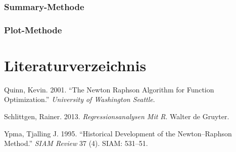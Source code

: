 \documentclass[12pt,]{article}
\begin{document}
\subsubsection{Summary-Methode}\label{summary-methode}

\subsubsection{Plot-Methode}\label{plot-methode}

\section*{Literaturverzeichnis}\label{literaturverzeichnis}

\hypertarget{refs}{}
\hypertarget{ref-quinn2001newton}{}
Quinn, Kevin. 2001. ``The Newton Raphson Algorithm for Function
Optimization.'' \emph{University of Washington Seattle}.

\hypertarget{ref-schlittgen2013regressionsanalysen}{}
Schlittgen, Rainer. 2013. \emph{Regressionsanalysen Mit R}. Walter de
Gruyter.

\hypertarget{ref-ypma1995historical}{}
Ypma, Tjalling J. 1995. ``Historical Development of the Newton--Raphson
Method.'' \emph{SIAM Review} 37 (4). SIAM: 531--51.
\end{document}
